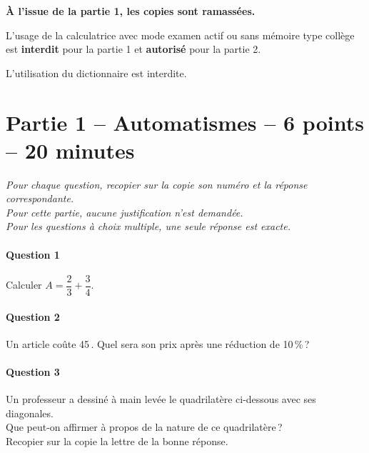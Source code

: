 \documentclass[11pt]{article}
\newcommand{\euro}{\eurologo{}}
\begin{document}
\vspace{12pt}

\begin{center}
\textbf{À l'issue de la partie 1, les copies sont ramassées.}
\end{center}

\vspace{12pt}
L'usage de la calculatrice avec mode examen actif ou sans mémoire \og type collège \fg est \textbf{interdit} pour la partie 1 et \textbf{autorisé} pour la partie 2.

L'utilisation du dictionnaire est interdite.

\bigskip


\section*{Partie 1 – Automatismes – 6 points – 20 minutes}


\begin{mdframed}
\itshape
Pour chaque question, recopier sur la copie son numéro et la réponse correspondante.\\
Pour cette partie, aucune justification n'est demandée.\\
Pour les questions à choix multiple, une seule réponse est exacte.
\end{mdframed}

\vspace{10pt}

\paragraph{Question 1}
Calculer $A = \dfrac{2}{3} + \dfrac{3}{4}$.

\vspace{8pt}
\paragraph{Question 2}
Un article coûte 45\,\euro. Quel sera son prix après une réduction de 10\,\%\,?

\vspace{8pt}
\paragraph{Question 3}
Un professeur a dessiné à main levée le quadrilatère ci-dessous avec ses diagonales.\\
Que peut-on affirmer à propos de la nature de ce quadrilatère\,?\\
Recopier sur la copie la lettre de la bonne réponse.
\end{document}
